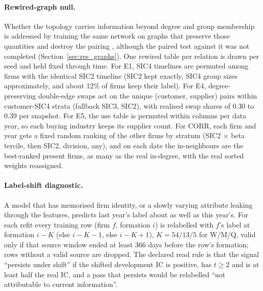 \paragraph{Rewired-graph null.}
Whether the topology carries information beyond degree and group membership is addressed by training the same network on graphs that preserve those quantities and destroy the pairing \citep{maslovsneppen2002}, although the paired test against it was not completed (Section~\ref{sec:res_graphs}). One rewired table per relation is drawn per seed and held fixed through time. For E1, SIC4 timelines are permuted among firms with the identical SIC2 timeline (SIC2 kept exactly, SIC4 group sizes approximately, and about 12\% of firms keep their label). For E4, degree-preserving double-edge swaps act on the unique (customer, supplier) pairs within customer-SIC4 strata (fallback SIC3, SIC2), with realised swap shares of 0.30 to 0.39 per snapshot. For E5, the use table is permuted within columns per data year, so each buying industry keeps its supplier count. For CORR, each firm and year gets a fixed random ranking of the other firms by stratum (SIC2 $\times$ beta tercile, then SIC2, division, any), and on each date the in-neighbours are the best-ranked present firms, as many as the real in-degree, with the real sorted weights reassigned.

\paragraph{Label-shift diagnostic.}
A model that has memorised firm identity, or a slowly varying attribute leaking through the features, predicts last year's label about as well as this year's. For each refit every training row (firm $f$, formation $i$) is relabelled with $f$'s label at formation $i-K$ (else $i-K-1$, else $i-K+1$), $K=54/13/5$ for W/M/Q, valid only if that source window ended at least 366 days before the row's formation; rows without a valid source are dropped. The declared read rule is that the signal ``persists under shift'' if the shifted development IC is positive, has $t\ge2$ and is at least half the real IC, and a pass that persists would be relabelled ``not attributable to current information''.
